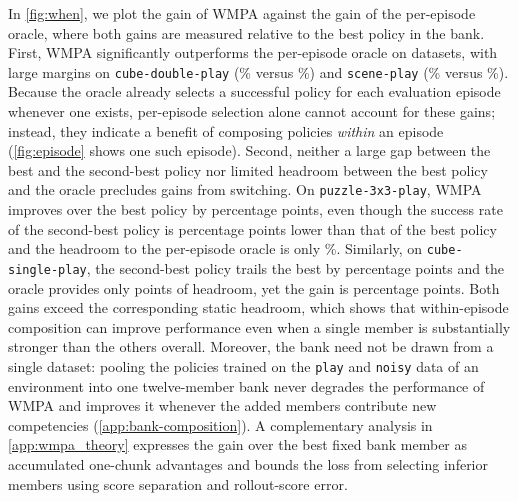 \documentclass{article}
\theoremstyle{plain}
\theoremstyle{definition}
\theoremstyle{plain}
\newcommand{\wmpa}{\textsc{WMPA}}
\begin{document}
In \cref{fig:when}, we plot the gain of \wmpa{} against the gain of the per-episode oracle, where both gains are measured relative to the best policy in the bank.
First, \wmpa{} significantly outperforms the per-episode oracle on \NumAboveUnionSig{} datasets, with large margins on \texttt{cube-double-play} (\WmppCubeDoublePlay\% versus \UnionCubeDoublePlay\%) and \texttt{scene-play} (\WmppScenePlay\% versus \UnionScenePlay\%).
Because the oracle already selects a successful policy for each evaluation episode whenever one exists, per-episode selection alone cannot account for these gains; instead, they indicate a benefit of composing policies \emph{within} an episode (\cref{fig:episode} shows one such episode).
Second, neither a large gap between the best and the second-best policy nor limited headroom between the best policy and the oracle precludes gains from switching.
On \texttt{puzzle-3x3-play}, \wmpa{} improves over the best policy by \GainPuzzleThreebyThreePlay{} percentage points, even though the success rate of the second-best policy is \DgapPuzzleThreebyThreePlay{} percentage points lower than that of the best policy and the headroom to the per-episode oracle is only \HeadroomPuzzleThreebyThreePlay{}\%.
Similarly, on \texttt{cube-single-play}, the second-best policy trails the best by \DgapCubeSinglePlay{} percentage points and the oracle provides only \HeadroomCubeSinglePlay{} points of headroom, yet the gain is \GainCubeSinglePlay{} percentage points.
Both gains exceed the corresponding static headroom, which shows that within-episode composition can improve performance even when a single member is substantially stronger than the others overall.
Moreover, the bank need not be drawn from a single dataset: pooling the policies trained on the \texttt{play} and \texttt{noisy} data of an environment into one twelve-member bank never degrades the performance of \wmpa{} and improves it whenever the added members contribute new competencies (\cref{app:bank-composition}). A complementary analysis in \cref{app:wmpa_theory} expresses the gain over the best fixed bank member as accumulated one-chunk advantages and bounds the loss from selecting inferior members using score separation and rollout-score error.

\end{document}
